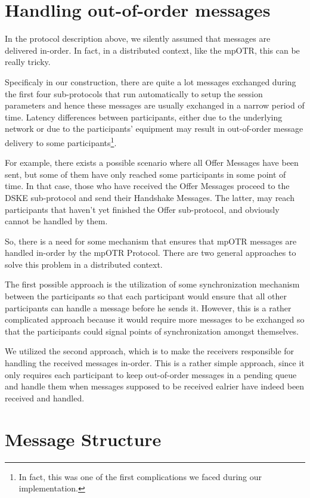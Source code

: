 \section{Handling out-of-order messages}
In the protocol description above, we silently assumed that messages are delivered in-order. In fact, in a distributed context, like the mpOTR, this can be really tricky.

Specificaly in our construction, there are quite a lot messages exchanged during the first four sub-protocols that run automatically to setup the session parameters and hence these messages are usually exchanged in a narrow period of time. Latency differences between participants, either due to the underlying network or due to the participants' equipment may result in out-of-order message delivery to some participants\footnote{In fact, this was one of the first complications we faced during our implementation.}.

For example, there exists a possible scenario where all Offer Messages have been sent, but some of them have only reached some participants in some point of time. In that case, those who have received the Offer Messages proceed to the DSKE sub-protocol and send their Handshake Messages. The latter, may reach participants that haven't yet finished the Offer sub-protocol, and obviously cannot be handled by them.

So, there is a need for some mechanism that ensures that mpOTR messages are handled in-order by the mpOTR Protocol. There are two general approaches to solve this problem in a distributed context.

The first possible approach is the utilization of some synchronization mechanism between the participants so that each participant would ensure that all other participants can handle a message before he sends it. However, this is a rather complicated approach because it would require more messages to be exchanged so that the participants could signal points of synchronization amongst themselves.

We utilized the second approach, which is to make the receivers responsible for handling the received messages in-order. This is a rather simple approach, since it only requires each participant to keep out-of-order messages in a pending queue and handle them when messages supposed to be received ealrier have indeed been received and handled.



\section{Message Structure}
\label{sections:message_structure}

